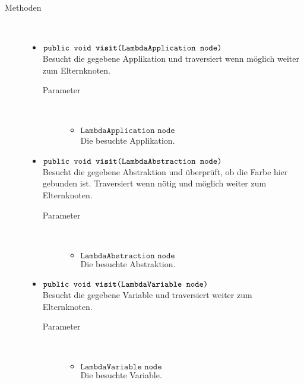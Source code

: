 \begin{description}
\item[Methoden] \hfill \\
	\vspace{-.8cm}
	\begin{itemize}
		\item $\texttt{public void \textbf{visit}(LambdaApplication node)}$ \\ Besucht die gegebene Applikation und traversiert wenn möglich weiter zum Elternknoten.
		\begin{description}
			\item[Parameter] \hfill \\
			\vspace{-.8cm}
			\begin{itemize}
				\item $\texttt{LambdaApplication node}$ \\ Die besuchte Applikation.
			\end{itemize}
		\end{description}
		
		\item $\texttt{public void \textbf{visit}(LambdaAbstraction node)}$ \\ Besucht die gegebene Abstraktion und überprüft, ob die Farbe hier gebunden ist. Traversiert wenn nötig und möglich weiter zum Elternknoten.
		\begin{description}
			\item[Parameter] \hfill \\
			\vspace{-.8cm}
			\begin{itemize}
				\item $\texttt{LambdaAbstraction node}$ \\ Die besuchte Abstraktion.
			\end{itemize}
		\end{description}
		
		\item $\texttt{public void \textbf{visit}(LambdaVariable node)}$ \\ Besucht die gegebene Variable und traversiert weiter zum Elternknoten.
		\begin{description}
			\item[Parameter] \hfill \\
			\vspace{-.8cm}
			\begin{itemize}
				\item $\texttt{LambdaVariable node}$ \\ Die besuchte Variable.
			\end{itemize}
		\end{description}
		

\end{itemize}
\end{description}
